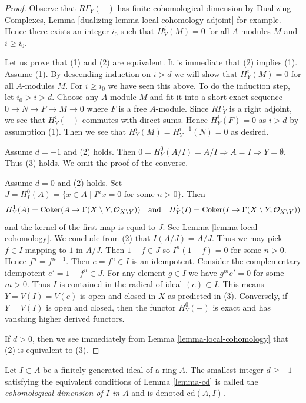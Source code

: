 \begin{proof}
Observe that $R\Gamma_Y(-)$ has finite cohomological dimension by
Dualizing Complexes, Lemma \ref{dualizing-lemma-local-cohomology-adjoint}
for example. Hence there exists an integer $i_0$ such that
$H^i_Y(M) = 0$ for all $A$-modules $M$ and $i \geq i_0$.

\medskip\noindent
Let us prove that (1) and (2) are equivalent. It is immediate that
(2) implies (1). Assume (1). By descending induction on $i > d$
we will show that $H^i_Y(M) = 0$ for all $A$-modules $M$.
For $i \geq i_0$ we have seen this above. To do the induction step,
let $i_0 > i > d$. Choose any $A$-module $M$ and fit it into
a short exact sequence $0 \to N \to F \to M \to 0$ where $F$ is a
free $A$-module. Since $R\Gamma_Y$ is a right adjoint, we see that
$H^i_Y(-)$ commutes with direct sums. Hence $H^i_Y(F) = 0$
as $i > d$ by assumption (1). Then we see that
$H^i_Y(M) = H^{i + 1}_Y(N) = 0$ as desired.

\medskip\noindent
Assume $d = -1$ and (2) holds. Then $0 = H^0_Y(A/I) = A/I \Rightarrow A = I
\Rightarrow Y = \emptyset$. Thus (3) holds. We omit the proof of the converse.

\medskip\noindent
Assume $d = 0$ and (2) holds. Set
$J = H^0_I(A) = \{x \in A \mid I^nx = 0 \text{ for some }n > 0\}$.
Then
$$
H^1_Y(A) = \mathop{\mathrm{Coker}}(A \to \Gamma(X \setminus Y, \mathcal{O}_{X \setminus Y}))
\quad\text{and}\quad
H^1_Y(I) = \mathop{\mathrm{Coker}}(I \to \Gamma(X \setminus Y, \mathcal{O}_{X \setminus Y}))
$$
and the kernel of the first map is equal to $J$. See
Lemma \ref{lemma-local-cohomology}.
We conclude from (2) that $I(A/J) = A/J$.
Thus we may pick $f \in I$
mapping to $1$ in $A/J$. Then $1 - f \in J$ so $I^n(1 - f) = 0$ for some
$n > 0$. Hence $f^n = f^{n + 1}$. Then $e = f^n \in I$ is an idempotent.
Consider the complementary idempotent $e' = 1 - f^n \in J$.
For any element $g \in I$ we have $g^m e' = 0$ for some $m > 0$.
Thus $I$ is contained in the radical of ideal $(e) \subset I$.
This means $Y = V(I) = V(e)$ is open and closed in $X$ as predicted in (3).
Conversely, if $Y = V(I)$ is open and closed, then the functor
$H^0_Y(-)$ is exact and has vanshing higher derived functors.

\medskip\noindent
If $d > 0$, then we see immediately from
Lemma \ref{lemma-local-cohomology} that (2) is equivalent to (3).
\end{proof}

\begin{definition}
\label{definition-cd}
Let $I \subset A$ be a finitely generated ideal of a ring $A$.
The smallest integer $d \geq -1$ satisfying the equivalent conditions
of Lemma \ref{lemma-cd} is called the
{\it cohomological dimension of $I$ in $A$} and is
denoted $\text{cd}(A, I)$.
\end{definition}

